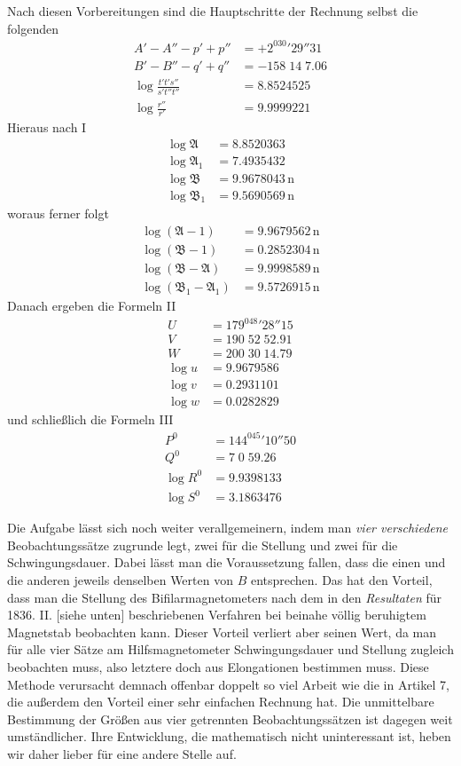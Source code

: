 Nach diesen Vorbereitungen sind die Hauptschritte der Rechnung selbst die folgenden
\[
\begin{aligned}
A'-A''-p'+p''&=+2^030'29''31\\
B'-B''-q'+q''&=-158\;14\;7.06\\
\log\frac{t't's''}{s't''t''}&=8.8524525\\
\log\frac{r''}{r'}&=9.9999221
\end{aligned}
\]
Hieraus nach I
\[
\begin{aligned}
\log\mathfrak{A}&=8.8520363\\
\log\mathfrak{A}_1&=7.4935432\\
\log\mathfrak{B}&=9.9678043\,\mathrm{n}\\
\log\mathfrak{B}_1&=9.5690569\,\mathrm{n}
\end{aligned}
\]
woraus ferner folgt
\[
\begin{aligned}
\log(\mathfrak{A}-1)&=9.9679562\,\mathrm{n}\\
\log(\mathfrak{B}-1)&=0.2852304\,\mathrm{n}\\
\log(\mathfrak{B}-\mathfrak{A})&=9.9998589\,\mathrm{n}\\
\log(\mathfrak{B}_1-\mathfrak{A}_1)&=9.5726915\,\mathrm{n}
\end{aligned}
\]
Danach ergeben die Formeln II
\[
\begin{aligned}
U&=179^048'28''15\\
V&=190\;52\;52.91\\
W&=200\;30\;14.79\\
\log u&=9.9679586\\
\log v&=0.2931101\\
\log w&=0.0282829
\end{aligned}
\]
und schließlich die Formeln III
\[
\begin{aligned}
P^0&=144^045'10''50\\
Q^0&=7\;0\;59.26\\
\log R^0&=9.9398133\\
\log S^0&=3.1863476
\end{aligned}
\]

Die Aufgabe lässt sich noch weiter verallgemeinern, indem man \textit{vier verschiedene} Beobachtungssätze zugrunde legt, zwei für die Stellung und zwei für die Schwingungsdauer. Dabei lässt man die Voraussetzung fallen, dass die einen und die anderen jeweils denselben Werten von $B$ entsprechen. Das hat den Vorteil, dass man die Stellung des Bifilarmagnetometers nach dem in den \textit{Resultaten} für 1836. II. [siehe unten] beschriebenen Verfahren bei beinahe völlig beruhigtem Magnetstab beobachten kann. Dieser Vorteil verliert aber seinen Wert, da man für alle vier Sätze am Hilfsmagnetometer Schwingungsdauer und Stellung zugleich beobachten muss, also letztere doch aus Elongationen bestimmen muss. Diese Methode verursacht demnach offenbar doppelt so viel Arbeit wie die in Artikel 7, die außerdem den Vorteil einer sehr einfachen Rechnung hat. Die unmittelbare Bestimmung der Größen aus vier getrennten Beobachtungssätzen ist dagegen weit umständlicher. Ihre Entwicklung, die mathematisch nicht uninteressant ist, heben wir daher lieber für eine andere Stelle auf.

